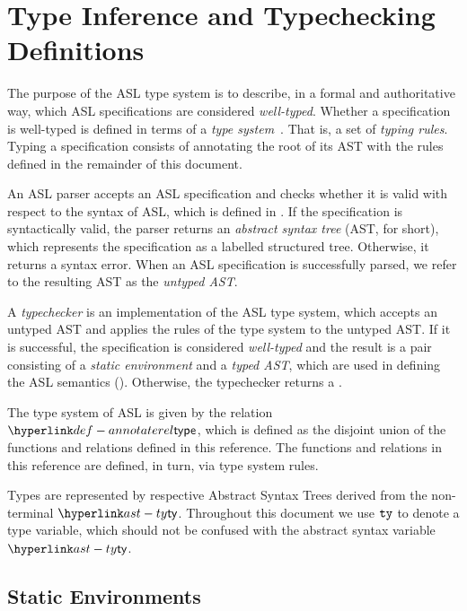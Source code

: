 \chapter{Type Inference and Typechecking Definitions\label{chap:TypeChecking}}

The purpose of the ASL type system is to describe, in a formal and authoritative way,
which ASL specifications are considered \emph{well-typed}.
Whether a specification is well-typed is defined in terms of a \emph{type system}~\cite{TypeSystemsLucaCardelli}.
That is, a set of \emph{typing rules}.
Typing a specification consists of annotating the root of its AST with the rules defined
in the remainder of this document.

An ASL parser accepts an ASL specification and checks whether it is valid with respect to the syntax of ASL,
which is defined in .
If the specification is syntactically valid, the parser returns an \emph{abstract syntax tree} (AST, for short),
which represents the specification as a labelled structured tree. Otherwise, it returns a syntax error.
When an ASL specification is successfully parsed, we refer to the resulting AST as the \emph{untyped AST}.

A \emph{typechecker} is an implementation of the ASL type system, which accepts an untyped AST and applies the
rules of the type system to the untyped AST. If it is successful, the specification
is considered \emph{well-typed} and the result is a pair consisting of
a \emph{static environment} and a \emph{typed AST},
which are used in defining the ASL semantics ().
Otherwise, the typechecker returns a \typingerrorterm{}.

\hypertarget{def-annotaterel}{}
The type system of ASL is given by the relation $\annotaterel$, which is defined as the disjoint union
of the functions and relations defined in this reference.
The functions and relations in this reference are defined, in turn, via type system rules.

Types are represented by respective Abstract Syntax Trees derived from the non-terminal $\ty$.
Throughout this document we use $\texttt{ty}$ to denote a type variable, which should not be confused with the abstract syntax variable $\ty$.

\section{Static Environments \label{sec:StaticEnvironments}}

